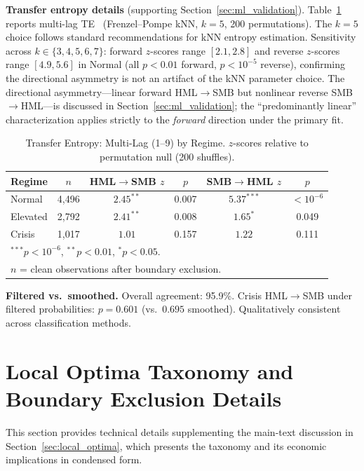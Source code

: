 \documentclass[sigconf,anonymous]{acmart}
\begin{document}
\textbf{Transfer entropy details} (supporting Section~\ref{sec:ml_validation}).
Table~\ref{tab:te} reports multi-lag TE~\cite{schreiber2000measuring,barnett2009granger}
(Frenzel--Pompe kNN, $k=5$, 200 permutations).
The $k=5$ choice follows standard recommendations for kNN entropy estimation.
Sensitivity across $k \in \{3,4,5,6,7\}$: forward $z$-scores range $[2.1, 2.8]$
and reverse $z$-scores range $[4.9, 5.6]$ in Normal (all $p < 0.01$ forward,
$p < 10^{-5}$ reverse), confirming the directional asymmetry is not an
artifact of the kNN parameter choice.
The directional asymmetry---linear forward HML$\to$SMB but nonlinear
reverse SMB$\to$HML---is discussed in Section~\ref{sec:ml_validation};
the ``predominantly linear'' characterization applies strictly to the
\emph{forward} direction under the primary fit.

\begin{table}[t]
\centering
\caption{Transfer Entropy: Multi-Lag (1--9) by Regime.
$z$-scores relative to permutation null (200 shuffles).}
\label{tab:te}
\scriptsize
\begin{tabular}{@{}lccccc@{}}
\toprule
Regime & $n$ & HML$\to$SMB $z$ & $p$ & SMB$\to$HML $z$ & $p$ \\
\midrule
Normal & 4,496 & $2.45^{**}$ & 0.007 & $5.37^{***}$ & $< 10^{-6}$ \\
Elevated & 2,792 & $2.41^{**}$ & 0.008 & $1.65^{*}$ & 0.049 \\
Crisis & 1,017 & $1.01$ & 0.157 & $1.22$ & 0.111 \\
\bottomrule
\multicolumn{6}{l}{\footnotesize $^{***}p < 10^{-6}$, $^{**}p < 0.01$, $^{*}p < 0.05$.} \\
\multicolumn{6}{l}{\footnotesize $n$ = clean observations after boundary exclusion.} \\
\end{tabular}
\end{table}

\textbf{Filtered vs.\ smoothed.} Overall agreement: 95.9\%.
Crisis HML$\to$SMB under filtered probabilities: $p = 0.601$ (vs.\ $0.695$ smoothed).
Qualitatively consistent across classification methods.

\section{Local Optima Taxonomy and Boundary Exclusion Details}
\label{app:optima}

This section provides technical details supplementing the main-text discussion in Section~\ref{sec:local_optima},
which presents the taxonomy and its economic implications in condensed form.
\end{document}
